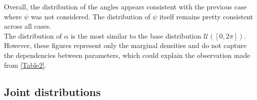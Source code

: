\documentclass[a4paper,12pt]{article}
\theoremstyle{definition}
\begin{document}
Overall, the distribution of the angles appears consistent with the previous case where \(\psi\) was not considered. The distribution of \(\psi\) itself remains pretty consistent across all cases.\\
The distribution of $\alpha$ is the most similar to the base distribution $\mathcal{U}([0,2\pi])$.\\
However, these figures represent only the marginal densities and do not capture the dependencies between parameters, which could explain the observation made from \ref{Table2}.

\subsection{Joint distributions}

\begin{figure}[htbp]
    \centering


\end{figure}
\end{document}
